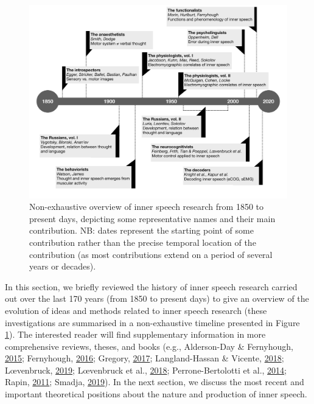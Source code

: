 \documentclass[a4paper,12pt,twoside,openright,oldfontcommands]{memoir}
\begin{document}
\begin{landscape}

\begin{figure}

{\centering \includegraphics[width=1\linewidth]{assets/timeline} 

}

\caption{Non-exhaustive overview of inner speech research from 1850 to present days, depicting some representative names and their main contribution. NB: dates represent the starting point of some contribution rather than the precise temporal location of the contribution (as most contributions extend on a period of several years or decades).}\label{fig:timeline}
\end{figure}

\end{landscape}

In this section, we briefly reviewed the history of inner speech research carried out over the last 170 years (from 1850 to present days) to give an overview of the evolution of ideas and methods related to inner speech research (these investigations are summarised in a non-exhaustive timeline presented in Figure \ref{fig:timeline}). The interested reader will find supplementary information in more comprehensive reviews, theses, and books (e.g., Alderson-Day \& Fernyhough, \protect\hyperlink{ref-alderson-day_inner_2015}{2015}; Fernyhough, \protect\hyperlink{ref-fernyhough_voices_2016}{2016}; Gregory, \protect\hyperlink{ref-gregory_inner_2017}{2017}; Langland-Hassan \& Vicente, \protect\hyperlink{ref-langland-hassan_inner_2018}{2018}; Lœvenbruck, \protect\hyperlink{ref-loevenbruck_loquor_2019}{2019}; Lœvenbruck et al., \protect\hyperlink{ref-loevenbruck_cognitive_2018}{2018}; Perrone-Bertolotti et al., \protect\hyperlink{ref-Perrone-Bertolotti2014}{2014}; Rapin, \protect\hyperlink{ref-Rapin2011}{2011}; Smadja, \protect\hyperlink{ref-smadja_parole_2019}{2019}). In the next section, we discuss the most recent and important theoretical positions about the nature and production of inner speech.
\end{document}
